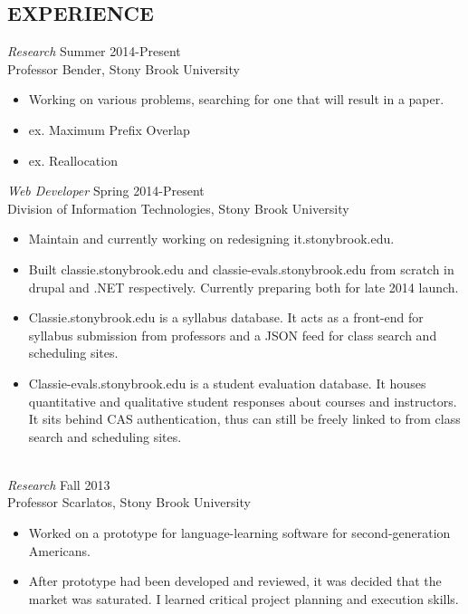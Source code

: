 \documentclass[margin]{res}
\begin{document}
\begin{resume}
\section{EXPERIENCE} 
                {\sl Research} \hfill           Summer 2014-Present \\
                Professor Bender, Stony Brook University
                \begin{itemize} \itemsep -2pt
                \item Working on various problems, searching for one that will result in a paper.
                \item ex. Maximum Prefix Overlap
                \item ex. Reallocation
                \end{itemize}
                {\sl Web Developer} \hfill    Spring 2014-Present \\
                Division of Information Technologies, Stony Brook University
                \begin{itemize} \itemsep -2pt
                \item Maintain and currently working on redesigning it.stonybrook.edu.
                \item Built classie.stonybrook.edu and classie-evals.stonybrook.edu from scratch in drupal and .NET respectively. Currently preparing both for late 2014 launch.
                \item Classie.stonybrook.edu is a syllabus database. It acts as a front-end for syllabus submission from professors and a JSON feed for class search and scheduling sites.
                \item Classie-evals.stonybrook.edu is a student evaluation database. It houses quantitative and qualitative student responses about courses and instructors. It sits behind CAS authentication, thus can still be freely linked to from class search and scheduling sites.
\\
\\
                \end{itemize}
                {\sl Research} \hfill           Fall 2013 \\
                Professor Scarlatos, Stony Brook University
                 \begin{itemize}  \itemsep -2pt %
                 \item Worked on a prototype for language-learning software for second-generation Americans.
                 \item After prototype had been developed and reviewed, it was decided that the market was saturated. I learned critical project planning and execution skills.
                 \end{itemize} 


\end{resume}
\end{document}
